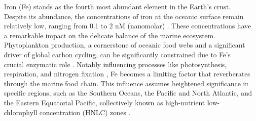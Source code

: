 \begin{comment}
Since the mid-1990s, atmospheric variations in CO2 began to be simulated using numerical models on a global scale \citep{johnson1997controls}. Various types of high and low complexity modeling have tried to achieve this goal, such as; box models, highly efficient but with a tendency to homogenize ocean volumes \citep{weber2010utility};  intermediate complexity coupled models, for instance, the Earth System Model of intermediate complexity (EMIC), with reduced parameterization but which operate at time scales that can exceed 10,000 years and; high-performance models that have a higher computational cost associated, as the General Circulation Models (GCM) (3-D models) \citep{flato2014evaluation}. However, the causes of CO2 variability between glacial and interglacial times remain poorly understood. For this reason, biogeochemistry has been incorporated as an important additional process to the physical processes of ocean-atmosphere dynamics. \\

Our goal is to highlight the current understanding of the effect that iron solubility has had on glacial-interglacial atmospheric CO2 balances. For this purpose, we conducted pre-industrial (PI) and LGM sensitivity simulations using cGENIE, an intermediate complexity model focused on the carbon cycle. For this purpose, we will use a set of different simulations and empirical dust deposition data, and heterogeneous Fe solubility fields, for both periods. Additionally, we focused here on regions highly sensitive to iron biogeochemistry such as the HNLC zones.

\end{comment}

Iron (Fe) stands as the fourth most abundant element in the Earth's crust. Despite its abundance, the concentrations of iron at the oceanic surface remain relatively low, ranging from 0.1 to 2 nM (nanomolar) \citep{nakabayashi2002variation,tani2003iron}. These concentrations have a remarkable impact on the delicate balance of the marine ecosystem. Phytoplankton production, a cornerstone of oceanic food webs and a significant driver of global carbon cycling, can be significantly constrained due to Fe's crucial enzymatic role \citep{martin1990glacial,jickells2005global,martinez2014iron}. Notably influencing processes like photosynthesis, respiration, and nitrogen fixation \citep{falkowski1998biogeochemical,morel2003biogeochemical,kustka2003revised}, Fe becomes a limiting factor that reverberates through the marine food chain. This influence assumes heightened significance in specific regions, such as the Southern Oceans, the Pacific and North Atlantic, and the Eastern Equatorial Pacific, collectively known as high-nutrient low-chlorophyll concentration (HNLC) zones \citep{coale1996massive,boyd2000mesoscale,boyd2004decline,boyd2007mesoscale}.

